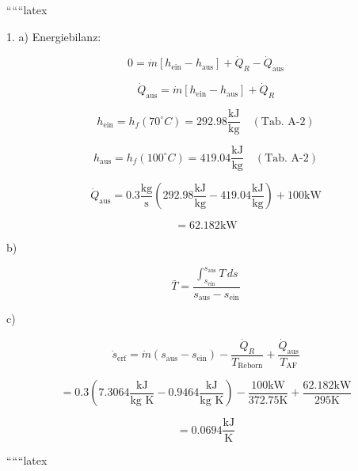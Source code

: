 
``````latex

1. a) Energiebilanz:

\[
0 = \dot{m} \left[ h_{\text{ein}} - h_{\text{aus}} \right] + \dot{Q}_R - \dot{Q}_{\text{aus}}
\]

\[
\dot{Q}_{\text{aus}} = \dot{m} \left[ h_{\text{ein}} - h_{\text{aus}} \right] + \dot{Q}_R
\]

\[
h_{\text{ein}} = h_f (70^\circ C) = 292.98 \frac{\text{kJ}}{\text{kg}} \quad (\text{Tab. A-2})
\]

\[
h_{\text{aus}} = h_f (100^\circ C) = 419.04 \frac{\text{kJ}}{\text{kg}} \quad (\text{Tab. A-2})
\]

\[
\dot{Q}_{\text{aus}} = 0.3 \frac{\text{kg}}{\text{s}} \left( 292.98 \frac{\text{kJ}}{\text{kg}} - 419.04 \frac{\text{kJ}}{\text{kg}} \right) + 100 \text{kW}
\]

\[
= 62.182 \text{kW}
\]

b)

\[
\bar{T} = \frac{\int_{s_{\text{ein}}}^{s_{\text{aus}}} T \, ds}{s_{\text{aus}} - s_{\text{ein}}}
\]

c)

\[
\dot{s}_{\text{erf}} = \dot{m} (s_{\text{aus}} - s_{\text{ein}}) - \frac{\dot{Q}_R}{T_{\text{Reborn}}} + \frac{\dot{Q}_{\text{aus}}}{T_{\text{AF}}}
\]

\[
= 0.3 \left( 7.3064 \frac{\text{kJ}}{\text{kg K}} - 0.9464 \frac{\text{kJ}}{\text{kg K}} \right) - \frac{100 \text{kW}}{372.75 \text{K}} + \frac{62.182 \text{kW}}{295 \text{K}}
\]

\[
= 0.0694 \frac{\text{kJ}}{\text{K}}
\]

``````latex


